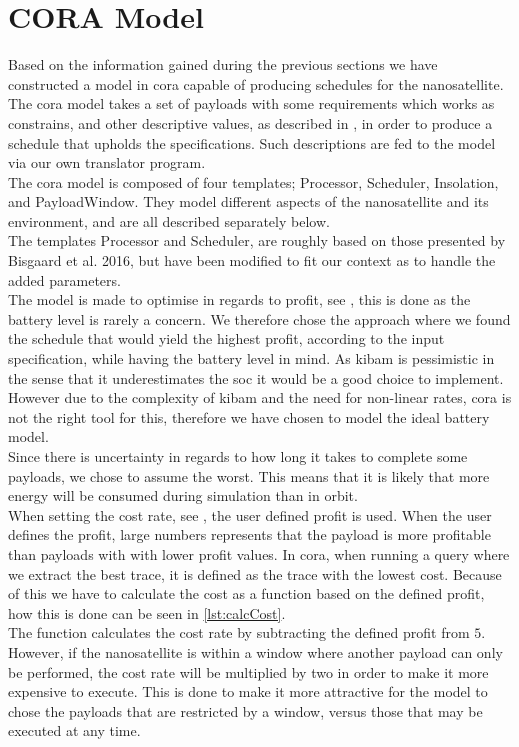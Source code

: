\section{CORA Model} \label{sec:cora}
Based on the information gained during the previous sections we have constructed a model in \gls{cora} capable of producing schedules for the nanosatellite.
The \gls{cora} model takes a set of payloads with some requirements which works as constrains, and other descriptive values, as described in , in order to produce a schedule that upholds the specifications.
Such descriptions are fed to the model via our own translator program.\\
The \gls{cora} model is composed of four templates; Processor, Scheduler, Insolation, and PayloadWindow.
They model different aspects of the nanosatellite and its environment, and are all described separately below.\\
The templates Processor and Scheduler, are roughly based on those presented by Bisgaard et al. 2016\cite{gomx3}, but have been modified to fit our context as to handle the added parameters.\\
The model is made to optimise in regards to profit, see , this is done as the battery level is rarely a concern\cite{gom_space_conversation}.
We therefore chose the approach where we found the schedule that would yield the highest profit, according to the input specification, while having the battery level in mind.
As \gls{kibam} is pessimistic in the sense that it underestimates the \gls{soc} it would be a good choice to implement.
However due to the complexity of \gls{kibam} and the need for non-linear rates, \gls{cora} is not the right tool for this, therefore we have chosen to model the ideal battery model.\\
Since there is uncertainty in regards to how long it takes to complete some payloads, we chose to assume the worst.
This means that it is likely that more energy will be consumed during simulation than in orbit.\\
When setting the cost rate, see , the user defined profit is used.
When the user defines the profit, large numbers represents that the payload is more profitable than payloads with with lower profit  values.
In \gls{cora}, when running a query where we extract the best trace, it is defined as the trace with the lowest cost.
Because of this we have to calculate the cost as a function based on the defined profit, how this is done can be seen in \cref{lst:calcCost}.\\
The function  calculates the cost rate by subtracting the defined profit from $5$.
However, if the nanosatellite is within a window where another payload can only be performed, the cost rate will be multiplied by two in order to make it more expensive to execute. 
This is done to make it more attractive for the model to chose the payloads that are restricted by a window, versus those that may be executed at any time.

